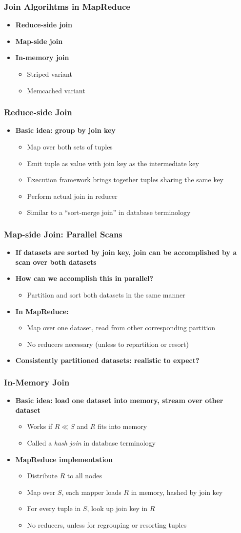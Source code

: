 \documentclass{beamer}
\newcommand{\bi}{\begin{itemize}}
\newcommand{\ei}{\end{itemize}}
\newcommand{\ii}{\item}
\newcommand*{\myblue}[1]{\textcolor{myblue}{#1}}
\begin{document}


\begin{frame}
\frametitle{Join Algorihtms in MapReduce}

\bi
\ii \textbf{Reduce-side join}
\ii \textbf{Map-side join}
\ii \textbf{In-memory join}
\bi
\ii Striped variant
\ii Memcached variant
\ei
\ei

\end{frame}



\begin{frame}
\frametitle{Reduce-side Join}

\bi
\ii \textbf{Basic idea: group by join key}
\bi
\ii Map over both sets of tuples
\ii Emit tuple as value with join key as the intermediate key
\ii Execution framework brings together tuples sharing the same key
\ii Perform actual join in reducer
\ii Similar to a “sort-merge join” in database terminology
\ei
\ei

\end{frame}



\begin{frame}
\frametitle{Map-side Join: Parallel Scans}

\bi
\ii \textbf{If datasets are sorted by join key, join can be accomplished by a scan over both datasets}
\ei

\bi
\ii \textbf{How can we accomplish this in parallel?}
\bi
\ii Partition and sort both datasets in the same manner
\ei
\ei 

\bi
\ii \textbf{In MapReduce:}
\bi
\ii Map over one dataset, read from other corresponding partition
\ii No reducers necessary (unless to repartition or resort)
\ei
\ei

\bi
\ii \textbf{Consistently partitioned datasets: realistic to expect?}
\ei

\end{frame}




\begin{frame}
\frametitle{In-Memory Join}

\bi
\ii \textbf{Basic idea: load one dataset into memory, stream over other dataset}
\bi
\ii Works if $R \ll S$ and $R$ fits into memory
\ii Called a \myblue{\textit{hash join}} in database terminology
\ei
\ei

\bi
\ii \textbf{MapReduce implementation}
\bi
\ii Distribute $R$ to all nodes
\ii Map over $S$, each mapper loads $R$ in memory, hashed by join key
\ii For every tuple in $S$, look up join key in $R$
\ii No reducers, unless for regrouping or resorting tuples
\ei
\ei

\end{frame}
\end{document}
